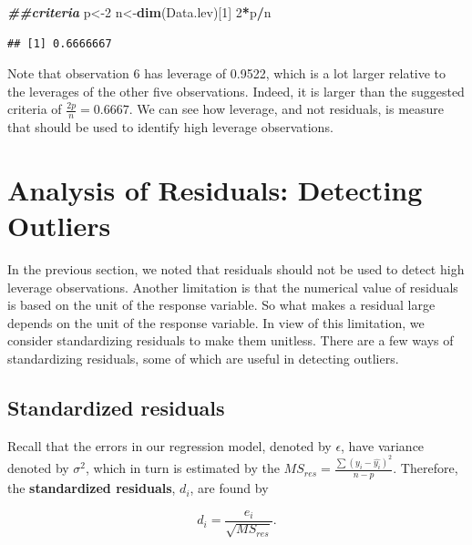 \documentclass[
]{book}
\newenvironment{Shaded}{\begin{snugshade}}{\end{snugshade}}
\newcommand{\DecValTok}[1]{\textcolor[rgb]{0.00,0.00,0.81}{#1}}
\newcommand{\DocumentationTok}[1]{\textcolor[rgb]{0.56,0.35,0.01}{\textbf{\textit{#1}}}}
\newcommand{\FunctionTok}[1]{\textcolor[rgb]{0.13,0.29,0.53}{\textbf{#1}}}
\newcommand{\NormalTok}[1]{#1}
\newcommand{\OtherTok}[1]{\textcolor[rgb]{0.56,0.35,0.01}{#1}}
\newcommand{\SpecialCharTok}[1]{\textcolor[rgb]{0.81,0.36,0.00}{\textbf{#1}}}
\begin{document}
\begin{Shaded}
\begin{Highlighting}[]
\DocumentationTok{\#\#criteria}
\NormalTok{p}\OtherTok{\textless{}{-}}\DecValTok{2}
\NormalTok{n}\OtherTok{\textless{}{-}}\FunctionTok{dim}\NormalTok{(Data.lev)[}\DecValTok{1}\NormalTok{]}
\DecValTok{2}\SpecialCharTok{*}\NormalTok{p}\SpecialCharTok{/}\NormalTok{n}
\end{Highlighting}
\end{Shaded}

\begin{verbatim}
## [1] 0.6666667
\end{verbatim}

Note that observation 6 has leverage of 0.9522, which is a lot larger relative to the leverages of the other five observations. Indeed, it is larger than the suggested criteria of \(\frac{2p}{n} = 0.6667\). We can see how leverage, and not residuals, is measure that should be used to identify high leverage observations.

\hypertarget{analysis-of-residuals-detecting-outliers}{%
\section{Analysis of Residuals: Detecting Outliers}\label{analysis-of-residuals-detecting-outliers}}

In the previous section, we noted that residuals should not be used to detect high leverage observations. Another limitation is that the numerical value of residuals is based on the unit of the response variable. So what makes a residual large depends on the unit of the response variable. In view of this limitation, we consider standardizing residuals to make them unitless. There are a few ways of standardizing residuals, some of which are useful in detecting outliers.

\hypertarget{standardized-residuals}{%
\subsection{Standardized residuals}\label{standardized-residuals}}

Recall that the errors in our regression model, denoted by \(\epsilon\), have variance denoted by \(\sigma^2\), which in turn is estimated by the \(MS_{res} = \frac{\sum(y_i - \hat{y_i})^2}{n-p}\). Therefore, the \textbf{standardized residuals}, \(d_i\), are found by

\begin{equation} 
d_{i} = \frac{e_i}{\sqrt{MS_{res}}}.
\label{eq:10di}
\end{equation}
\end{document}
